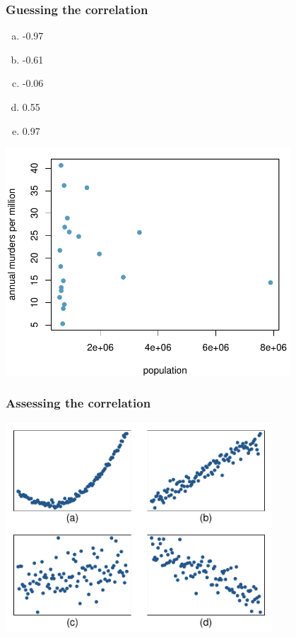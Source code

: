 \documentclass[11pt,containsverbatim,handout,xcolor=xelatex,dvipsnames,table]{beamer}
\newcommand{\solnMult}[1]{#1}
\newcommand{\soln}[1]{}
\begin{document}
\begin{frame}
\frametitle{Guessing the correlation}


{
\begin{enumerate}[(a)]
\item -0.97
\item -0.61
\item \solnMult{-0.06}
\item 0.55
\item 0.97
\end{enumerate}
}
{
\begin{center}
\includegraphics[width=0.8\textwidth]{figures/murder/annual_murders_per_mil_population}
\end{center}
}

\end{frame}


\begin{frame}
\frametitle{Assessing the correlation}


{
\begin{center}
\includegraphics[width=0.75\textwidth]{figures/cor/cor}
\end{center}
}
{
\soln{\only<2>{\red{
(b) $\rightarrow$ correlation means \underline{linear} association
}}}
}

\end{frame}
\end{document}

